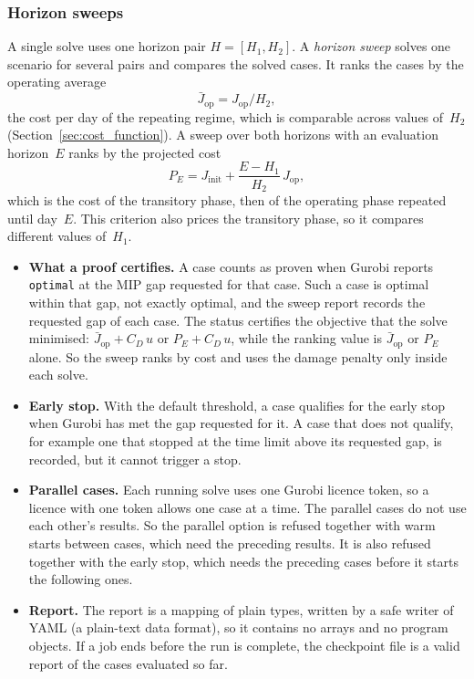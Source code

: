 \documentclass[11pt,a4paper]{article}
\theoremstyle{plain}
\theoremstyle{definition}
\theoremstyle{remark}
\begin{document}
\subsubsection{Horizon sweeps}
\label{sec:impl_sweeps}

A single solve uses one horizon pair $H = [H_1, H_2]$.
A \emph{horizon sweep} solves one scenario for several pairs and compares the solved cases.
It ranks the cases by the operating average
\begin{equation}
  \bar J_{\mathrm{op}} = J_{\mathrm{op}}/H_2,
\end{equation}
the cost per day of the repeating regime, which is comparable across values of~$H_2$ (Section~\ref{sec:cost_function}).
A sweep over both horizons with an evaluation horizon~$E$ ranks by the projected cost
\begin{equation}
  P_E = J_{\mathrm{init}} + \frac{E - H_1}{H_2}\,J_{\mathrm{op}},
\end{equation}
which is the cost of the transitory phase, then of the operating phase repeated until day~$E$.
This criterion also prices the transitory phase, so it compares different values of~$H_1$.
\begin{itemize}
  \item \textbf{What a proof certifies.} A case counts as proven when Gurobi reports \texttt{optimal} at the MIP gap requested for that case.
    Such a case is optimal within that gap, not exactly optimal, and the sweep report records the requested gap of each case.
    The status certifies the objective that the solve minimised: $\bar J_{\mathrm{op}} + C_D\,u$ or $P_E + C_D\,u$, while the ranking value is $\bar J_{\mathrm{op}}$ or $P_E$ alone.
    So the sweep ranks by cost and uses the damage penalty only inside each solve.
  \item \textbf{Early stop.} With the default threshold, a case qualifies for the early stop when Gurobi has met the gap requested for it.
    A case that does not qualify, for example one that stopped at the time limit above its requested gap, is recorded, but it cannot trigger a stop.
  \item \textbf{Parallel cases.} Each running solve uses one Gurobi licence token, so a licence with one token allows one case at a time.
    The parallel cases do not use each other's results.
    So the parallel option is refused together with warm starts between cases, which need the preceding results.
    It is also refused together with the early stop, which needs the preceding cases before it starts the following ones.
  \item \textbf{Report.} The report is a mapping of plain types, written by a safe writer of YAML (a plain-text data format), so it contains no arrays and no program objects.
    If a job ends before the run is complete, the checkpoint file is a valid report of the cases evaluated so far.
\end{itemize}
\end{document}
